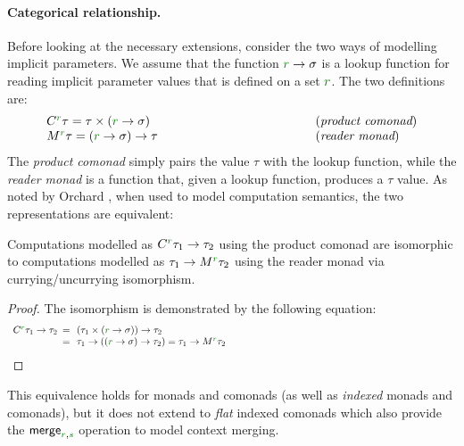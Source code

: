 \paragraph{Categorical relationship.}
Before looking at the necessary extensions, consider the two ways of modelling implicit 
parameters. We assume that the function $\cclrd{r} \rightarrow \sigma$ is a lookup function
for reading implicit parameter values that is defined on a set $\cclrd{r}$. The two definitions
are:
%
\begin{equation*}
\begin{array}{lll}
 \ctyp{\cclrd{r}}\tau = \tau \times (\cclrd{r} \rightarrow \sigma) &~\hspace{10em}~& (\emph{product comonad}) \\
 \mtyp{\cclrd{r}}\tau = (\cclrd{r} \rightarrow \sigma) \rightarrow \tau && (\emph{reader monad})
\end{array} 
\end{equation*}
%
The \emph{product comonad} simply pairs the value $\tau$ with the lookup function, while
the \emph{reader monad} is a function that, given a lookup function, produces a $\tau$ value.
As noted by Orchard \cite{comonads-vs-monads}, when used to model computation semantics, the 
two representations are equivalent:
%
\begin{remark}
Computations modelled as $\ctyp{\cclrd{r}}{\tau_1}\rightarrow\tau_2$ using the product comonad
are isomorphic to computations modelled as $\tau_1\rightarrow\mtyp{\cclrd{r}}{\tau_2}$ using the
reader monad via currying/uncurrying isomorphism.
\end{remark}
\begin{proof}
The isomorphism is demonstrated by the following equation:
\begin{equation*}
\begin{array}{lll}
 \ctyp{\cclrd{r}}{\tau_1} \rightarrow \tau_2 &\narrow{=}&
 (\tau_1 \times (\cclrd{r} \rightarrow \sigma)) \rightarrow \tau_2 \\
 &\narrow{=}& \tau_1 \rightarrow ((\cclrd{r} \rightarrow \sigma) \rightarrow \tau_2) =
 \tau_1 \rightarrow \mtyp{\cclrd{r}}{\tau_2} \hspace{23em}\qedhere \\
\end{array}
\end{equation*}
\end{proof}

\noindent
This equivalence holds for monads and comonads (as well as \emph{indexed} monads
and comonads), but it does not extend to \emph{flat} indexed comonads which also provide
the $\ident{merge}_{\cclrd{r}, \cclrd{s}}$ operation to model context merging.

